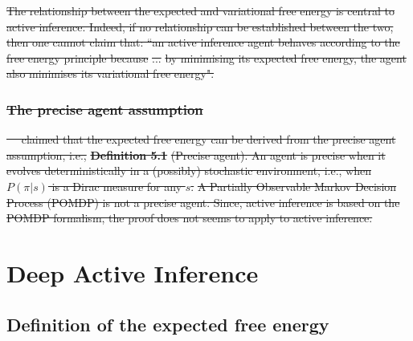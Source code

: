 \documentclass[twoside,11pt]{article}
\providecommand{\DIFdel}[1]{{\protect\color{red}\sout{#1}}}                      %
\providecommand{\DIFdelend}{} %
\begin{document}
\DIFdel{The relationship between the expected and variational free energy is central to active inference. Indeed, if no relationship can be established between the two, then one cannot claim that: ``an active inference agent behaves according to the free energy principle because }%
\DIFdel{...}%
\DIFdel{by minimising its expected free energy, the agent also minimises its variational free energy".
}%

\subsubsection{\DIFdel{The precise agent assumption}}
\addtocounter{subsubsection}{-1}%

\DIFdel{\mbox{%
\citet{barp2022geometric} }\hspace{0pt}%
claimed that the expected free energy can be derived from the precise agent assumption, i.e.,
}%
\textbf{\DIFdel{Definition 5.1}} %
\DIFdel{(Precise agent). An agent is precise when it evolves deterministically in a (possibly) stochastic environment, i.e., when $P(\pi | s)$ is a Dirac measure for any $s$.
}%
\DIFdel{A Partially Observable Markov Decision Process (POMDP) is not a precise agent. Since, active inference is based on the POMDP formalism, the proof does not seems to apply to active inference.
}%

\DIFdelend \section{Deep Active Inference} \label{sec:DAI}

\subsection{Definition of the expected free energy}
\end{document}
